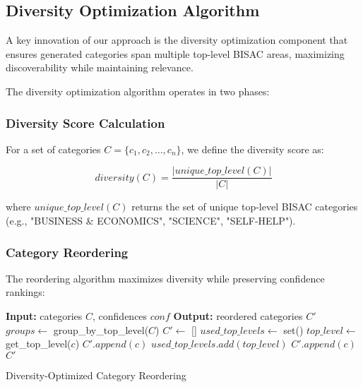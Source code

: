 \documentclass{article}
\begin{document}
\subsection{Diversity Optimization Algorithm}

A key innovation of our approach is the diversity optimization component that ensures generated categories span multiple top-level BISAC areas, maximizing discoverability while maintaining relevance.

The diversity optimization algorithm operates in two phases:

\subsubsection{Diversity Score Calculation}
For a set of categories $C = \{c_1, c_2, \ldots, c_n\}$, we define the diversity score as:

\begin{equation}
diversity(C) = \frac{|unique\_top\_level(C)|}{|C|}
\end{equation}

where $unique\_top\_level(C)$ returns the set of unique top-level BISAC categories (e.g., "BUSINESS \& ECONOMICS", "SCIENCE", "SELF-HELP").

\subsubsection{Category Reordering}
The reordering algorithm maximizes diversity while preserving confidence rankings:

\begin{algorithm}
\begin{algorithmic}[1]
\STATE \textbf{Input:} categories $C$, confidences $conf$
\STATE \textbf{Output:} reordered categories $C'$
\STATE
\STATE $groups \leftarrow$ group\_by\_top\_level($C$)
\STATE $C' \leftarrow$ []
\STATE $used\_top\_levels \leftarrow$ set()
\STATE
{}
    \STATE $top\_level \leftarrow$ get\_top\_level($c$)
        \STATE $C'.append(c)$
        \STATE $used\_top\_levels.add(top\_level)$
    \ENDIF
\ENDFOR
\STATE
{}
        \STATE $C'.append(c)$
    \ENDIF
\ENDFOR
\STATE
\RETURN $C'$
\end{algorithmic}
\caption{Diversity-Optimized Category Reordering}
\label{alg:diversity_optimization}
\end{algorithm}
\end{document}
